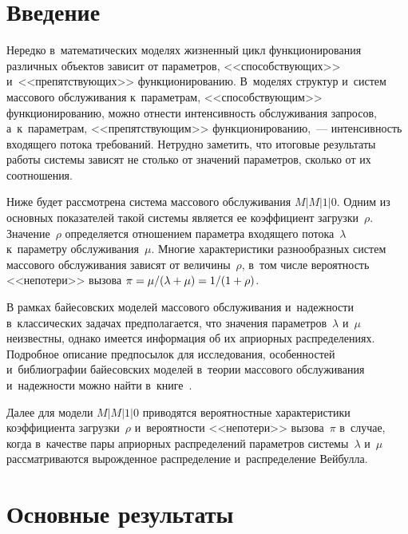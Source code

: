 


\thispagestyle{headings}

\begin{multicols}{2}

\label{st\stat}


\section{Введение}

Нередко в~математических моделях жизненный цикл функционирования различных объектов 
зависит от параметров, <<способствующих>> и~<<препятствующих>> функционированию. 
В~моделях структур и~систем массового обслуживания к~параметрам, <<способствующим>> 
функционированию, можно отнести интенсивность обслуживания запросов, а~к~параметрам, 
<<препятствующим>> функционированию,~--- интенсивность входящего потока требований. 
Нетрудно заметить, что итоговые результаты работы системы зависят не столько от 
значений параметров, сколько от их соотношения.

Ниже будет рассмотрена система массового обслуживания $M|M|1|0$. Одним из основных 
показателей такой системы является ее коэффициент загрузки~$\rho$. Значение~$\rho$ 
определяется отношением параметра входящего потока~$\lambda$ к~параметру 
обслуживания~$\mu$. Многие характеристики разнообразных систем массового обслуживания 
зависят от величины~$\rho$, в~том числе вероятность <<непотери>> вызова 
$\pi \hm= {\mu/(\lambda \hm+ \mu)} \hm= {1/(1\hm+\rho)}$.

В рамках байесовских моделей массового обслуживания и~надежности в~классических 
задачах предполагается, что значения параметров~$\lambda$ и~$\mu$ неизвестны, однако 
имеется информация об их априорных распределениях.
Подробное описание предпосылок для исследования, особенностей 
и~библиографии байесовских моделей 
в~теории массового обслуживания и~надежности можно найти в~книге~\cite{KuSh2015}.

Далее для модели $M|M|1|0$ приводятся вероятностные характеристики коэффициента 
загрузки~$\rho$  и~вероятности <<непотери>> вызова~$\pi$ в~случае, когда в~качестве 
пары априорных распределений па\-ра\-мет\-ров системы~$\lambda$ и~$\mu$ рассматриваются 
вырожденное распределение и~распределение Вейбулла.

\vspace*{-9pt}

\section{Основные результаты}


\end{multicols}
